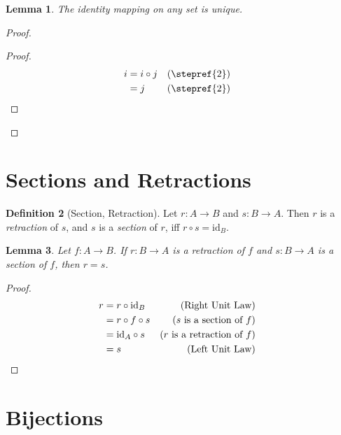 \documentclass{book}
\let\qed\relax
\newtheorem{lm}{Lemma}[chapter]
\theoremstyle{definition}
\newtheorem{df}[lm]{Definition}
\newcommand{\id}[1]{\ensuremath{\mathrm{id}_{#1}}}
\begin{document}
  \begin{lm}
    The identity mapping on any set is unique.
  \end{lm}
  
  \begin{proof}
    \pf
    \begin{proof}
      \pf
      \begin{align*}
        i & = i \circ j & (\text{\stepref{2}}) \\
        & = j & (\text{\stepref{2}}) & \qed
      \end{align*}
    \end{proof}
  \end{proof}
  
  \section{Sections and Retractions}
  
  \begin{df}[Section, Retraction]
    Let $r : A \rightarrow B$ and $s : B \rightarrow A$. Then $r$ is a 
    \emph{retraction} of $s$, and $s$ is a \emph{section} of $r$, iff $r \circ s 
    = 
    \id{B}$.
  \end{df}
  
  \begin{lm}
    \label{lm:section_retraction:equal}
    Let $f : A \rightarrow B$.  If $r : B \rightarrow A$ is a retraction of $f$ 
    and $s : B \rightarrow A$ is a section of $f$, then $r = s$.
  \end{lm}
  
  \begin{proof}
    \pf
    \begin{align*}
      r & = r \circ \id{B} & (\text{Right Unit Law}) \\
      & = r \circ f \circ s & (\text{$s$ is a section of $f$}) \\
      & = \id{A} \circ s & (\text{$r$ is a retraction of $f$}) \\
      & = s & (\text{Left Unit Law}) & \qed
    \end{align*}
  \end{proof}
  
  \section{Bijections}
  
\end{document}
